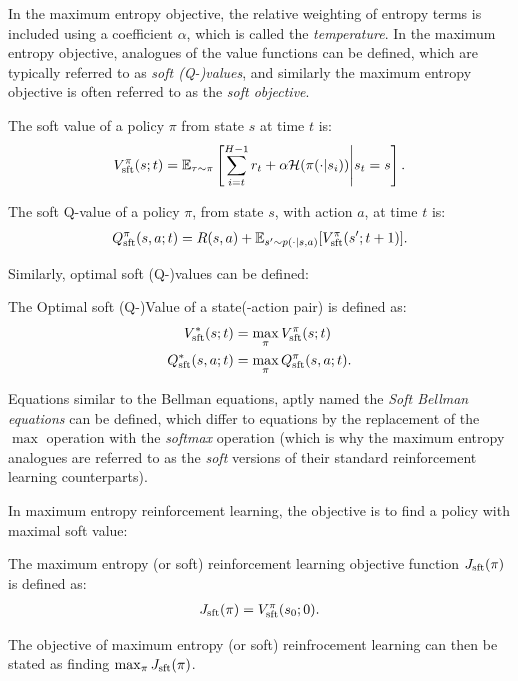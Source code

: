         In the maximum entropy objective, the relative weighting of entropy terms is included using a coefficient $\alpha$, which is called the \textit{temperature}. In the maximum entropy objective, analogues of the value functions can be defined, which are typically referred to as \textit{soft (Q-)values}, and similarly the maximum entropy objective is often referred to as the \textit{soft objective}.

        \begin{defn}
            \label{def:sft_value}
            \label{def:sft_q_value}
            The \textnormal{soft value} of a policy $\pi$ from state $s$ at time $t$ is:
            \begin{align}
                V_{{\textnormal{sft}}}^{\pi}(s;t) = \mathbb{E}_{\tau\sim\pi}\left[\sum_{i=t}^{H-1} r_t + \alpha\mathcal{H}(\pi(\cdot|s_i)) \Bigg| s_t=s \right].
            \end{align} 

            The \textnormal{soft Q-value} of a policy $\pi$, from state $s$, with action $a$, at time $t$ is:
            \begin{align}
                Q_{{\textnormal{sft}}}^{\pi}(s,a;t) = R(s,a) + \mathbb{E}_{s'\sim p(\cdot|s,a)} [V_{{\textnormal{sft}}}^{\pi}(s';t+1)].
            \end{align} 
        \end{defn}

        Similarly, optimal soft (Q-)values can be defined:
        \begin{defn}
            \label{def:optimal_sft_value}
            \label{def:optimal_sft_q_value}
            The \textnormal{Optimal soft (Q-)Value} of a state(-action pair) is defined as:
            \begin{align}
                V_{{\textnormal{sft}}}^*(s;t) &= \max_{\pi} V_{{\textnormal{sft}}}^{\pi}(s;t) \\
                Q_{{\textnormal{sft}}}^*(s,a;t) &= \max_{\pi} Q_{{\textnormal{sft}}}^{\pi}(s,a;t).
            \end{align}
        \end{defn}

        Equations similar to the Bellman equations, aptly named the \textit{Soft Bellman equations} can be defined, which differ to equations  by the replacement of the $\max$ operation with the \textit{softmax} operation (which is why the maximum entropy analogues are referred to as the \textit{soft} versions of their standard reinforcement learning counterparts).

        In maximum entropy reinforcement learning, the objective is to find a policy with maximal soft value:
        \begin{defn}
            The \textnormal{maximum entropy (or soft) reinforcement learning objective function} $J_{{\textnormal{sft}}}(\pi)$ is defined as:
            \begin{align}
                J_{{\textnormal{sft}}}(\pi) = V_{{\textnormal{sft}}}^{\pi}(s_0;0).
            \end{align}

            The objective of maximum entropy (or soft) reinfrocement learning can then be stated as finding $\max_{\pi} J_{{\textnormal{sft}}}(\pi)$.
        \end{defn}

